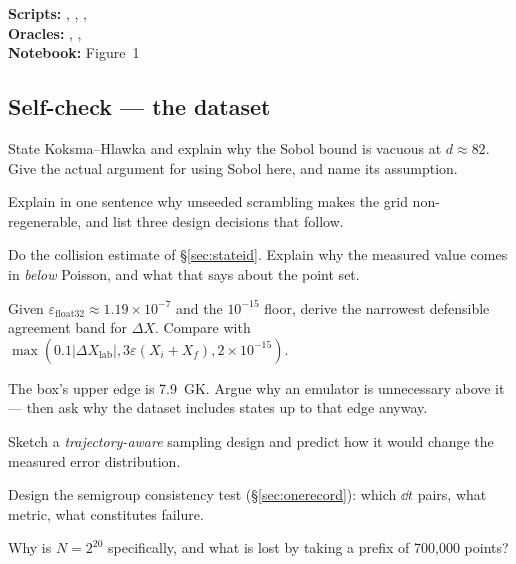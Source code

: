 \begin{repopointer}
\textbf{Scripts:} ,
, ,
\\
\textbf{Oracles:} , ,
\\
\textbf{Notebook:}  Figure~1
\end{repopointer}

\subsection*{Self-check --- the dataset}
\label{sec:selfcheck-dataset}

\begin{selfcheck}
\item State Koksma--Hlawka and explain why the Sobol bound is vacuous at
      $d \approx 82$. Give the actual argument for using Sobol here, and name
      its assumption.
\item Explain in one sentence why unseeded scrambling makes the grid
      non-regenerable, and list three design decisions that follow.
\item Do the collision estimate of \S\ref{sec:stateid}. Explain why the measured
      value comes in \emph{below} Poisson, and what that says about the point
      set.
\item Given $\varepsilon_{\mathrm{float32}} \approx 1.19\times10^{-7}$ and the
      $10^{-15}$ floor, derive the narrowest defensible agreement band for
      $\Delta X$. Compare with
      $\max(0.1|\Delta X_{\mathrm{lab}}|, 3\varepsilon(X_i+X_f),
      2\times10^{-15})$.
\item The box's upper edge is 7.9~GK. Argue why an emulator is unnecessary above
      it --- then ask why the dataset includes states up to that edge anyway.
      \label{sc:tupper}
\item Sketch a \emph{trajectory-aware} sampling design and predict how it would
      change the measured error distribution.
\item Design the semigroup consistency test (\S\ref{sec:onerecord}): which
      $\dd t$ pairs, what metric, what constitutes failure.
\item Why is $N = 2^{20}$ specifically, and what is lost by taking a prefix of
      700,000 points?
\end{selfcheck}
